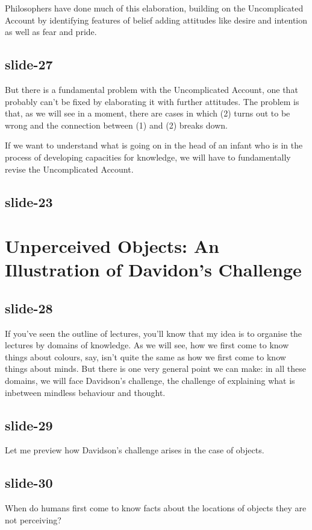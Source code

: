 \documentclass[12pt,\papersize]{extarticle}
\begin{document}
Philosophers have done much of this elaboration, building on the Uncomplicated
Account by identifying features of belief adding attitudes like desire
and intention as well as fear and pride.

\subsection{slide-27}
But there is a fundamental problem with the Uncomplicated Account,
one that probably can’t be fixed by elaborating it with further attitudes.
The problem is that, as we will see in a moment, there are cases in which
(2) turns out to be wrong and the connection between (1) and (2) breaks down.

If we want to understand what is going on in the head of an infant who is
in the process of developing capacities for knowledge, we will have to
fundamentally revise the Uncomplicated Account.

\subsection{slide-23}


\section{Unperceived Objects: An Illustration of Davidon's Challenge}

\subsection{slide-28}
If you've seen the outline of lectures, you'll know that my idea is to organise the lectures
by domains of knowledge.
As we will see, how we first come to know things about colours, say, isn't quite the same
as how we first come to know things about minds.
But there is one very general point we can make: in all these domains, we will face
Davidson's challenge, the challenge of explaining what is inbetween mindless behaviour
and thought.

\subsection{slide-29}
Let me preview how Davidson's challenge arises in the case of objects.

\subsection{slide-30}
When do humans first come to know facts about the locations of objects they are not
perceiving?
\end{document}
